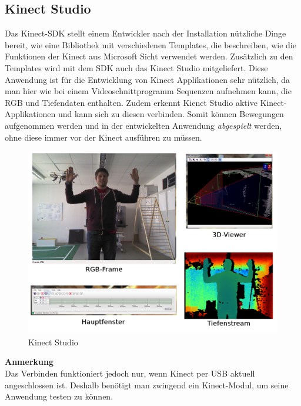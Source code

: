 \subsection{Kinect Studio}
Das Kinect-SDK stellt einem Entwickler nach der Installation nützliche Dinge bereit, wie eine Bibliothek mit verschiedenen Templates, die beschreiben, wie die Funktionen der Kinect aus Microsoft Sicht verwendet werden. Zusätzlich zu den Templates wird mit dem SDK auch das Kinect Studio mitgeliefert. Diese Anwendung ist für die Entwicklung von Kinect Applikationen sehr nützlich, da man hier wie bei einem Videoschnittprogramm Sequenzen aufnehmen kann, die RGB und Tiefendaten enthalten. Zudem erkennt Kienct Studio aktive Kinect-Applikationen und kann sich zu diesen verbinden. Somit können Bewegungen aufgenommen werden und in der entwickelten Anwendung \textit{abgespielt} werden, ohne diese immer vor der Kinect ausführen zu müssen.
\begin{figure}[H]						
	\centering							
	\includegraphics[scale=0.4]{Bilder/Kinect_Studio.png}			
	\caption{Kinect Studio}						
	\label{f:kinect_studio}						
\end{figure}
\textbf{Anmerkung}\\
Das Verbinden funktioniert jedoch nur, wenn Kinect per USB aktuell angeschlossen ist. Deshalb benötigt man zwingend ein Kinect-Modul, um seine Anwendung testen zu können.